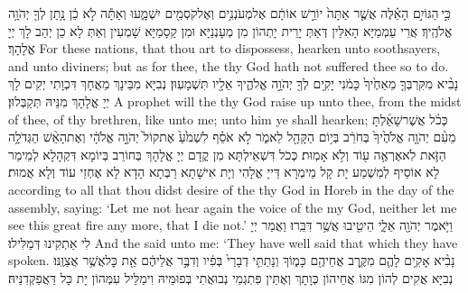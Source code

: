 {כִּ֣י \legarmeh  הַגּוֹיִ֣ם הָאֵ֗לֶּה אֲשֶׁ֤ר אַתָּה֙ יוֹרֵ֣שׁ אוֹתָ֔ם אֶל\maqqaf מְעֹנְנִ֥ים וְאֶל\maqqaf קֹסְמִ֖ים יִשְׁמָ֑עוּ וְאַתָּ֕ה לֹ֣א כֵ֔ן נָ֥תַן לְךָ֖ יְהֹוָ֥ה אֱלֹהֶֽיךָ׃}
{אֲרֵי עַמְמַיָּא הָאִלֵּין דְּאַתְּ יָרֵית יָתְהוֹן מִן מְעָנְנַיָּא וּמִן קַסָמַיָּא שָׁמְעִין וְאַתְּ לָא כֵן יְהַב לָךְ יְיָ אֱלָהָךְ׃}
{For these nations, that thou art to dispossess, hearken unto soothsayers, and unto diviners; but as for thee, the \lord\space thy God hath not suffered thee so to do.}{}
{נָבִ֨יא מִקִּרְבְּךָ֤ מֵאַחֶ֙יךָ֙ כָּמֹ֔נִי יָקִ֥ים לְךָ֖ יְהֹוָ֣ה אֱלֹהֶ֑יךָ אֵלָ֖יו תִּשְׁמָעֽוּן׃}
{נְבִיָּא מִבֵּינָךְ מֵאֲחָךְ דִּכְוָתִי יְקִים לָךְ יְיָ אֱלָהָךְ מִנֵּיהּ תְּקַבְּלוּן׃}
{A prophet will the \lord\space thy God raise up unto thee, from the midst of thee, of thy brethren, like unto me; unto him ye shall hearken;}{}
{כְּכֹ֨ל אֲשֶׁר\maqqaf שָׁאַ֜לְתָּ מֵעִ֨ם יְהֹוָ֤ה אֱלֹהֶ֙יךָ֙ בְּחֹרֵ֔ב בְּי֥וֹם הַקָּהָ֖ל לֵאמֹ֑ר לֹ֣א אֹסֵ֗ף לִשְׁמֹ֙עַ֙ אֶת\maqqaf קוֹל֙ יְהֹוָ֣ה אֱלֹהָ֔י וְאֶת\maqqaf הָאֵ֨שׁ הַגְּדֹלָ֥ה הַזֹּ֛את לֹֽא\maqqaf אֶרְאֶ֥ה ע֖וֹד וְלֹ֥א אָמֽוּת׃}
{כְּכֹל דִּשְׁאֵילְתָּא מִן קֳדָם יְיָ אֱלָהָךְ בְּחוֹרֵב בְּיוֹמָא דִּקְהָלָא לְמֵימַר לָא אוֹסֵיף לְמִשְׁמַע יָת קָל מֵימְרָא דַּייָ אֱלָהִי וְיָת אִישָׁתָא רַבְּתָא הָדָא לָא אֶחְזֵי עוֹד וְלָא אֲמוּת׃}
{according to all that thou didst desire of the \lord\space thy God in Horeb in the day of the assembly, saying: ‘Let me not hear again the voice of the \lord\space my God, neither let me see this great fire any more, that I die not.’}{}
{וַיֹּ֥אמֶר יְהֹוָ֖ה אֵלָ֑י הֵיטִ֖יבוּ אֲשֶׁ֥ר דִּבֵּֽרוּ׃}
{וַאֲמַר יְיָ לִי אַתְקִינוּ דְּמַלִּילוּ׃}
{And the \lord\space said unto me: ‘They have well said that which they have spoken.}{}
{נָבִ֨יא אָקִ֥ים לָהֶ֛ם מִקֶּ֥רֶב אֲחֵיהֶ֖ם כָּמ֑וֹךָ וְנָתַתִּ֤י דְבָרַי֙ בְּפִ֔יו וְדִבֶּ֣ר אֲלֵיהֶ֔ם אֵ֖ת כׇּל\maqqaf אֲשֶׁ֥ר אֲצַוֶּֽנּוּ׃}
{נְבִיָּא אֲקִים לְהוֹן מִגּוֹ אֲחֵיהוֹן כְּוָתָךְ וְאֶתֵּין פִּתְגְמֵי נְבוּאֲתִי בְּפוּמֵּיהּ וִימַלֵּיל עִמְּהוֹן יָת כָּל דַּאֲפַקְּדִנֵּיהּ׃}
